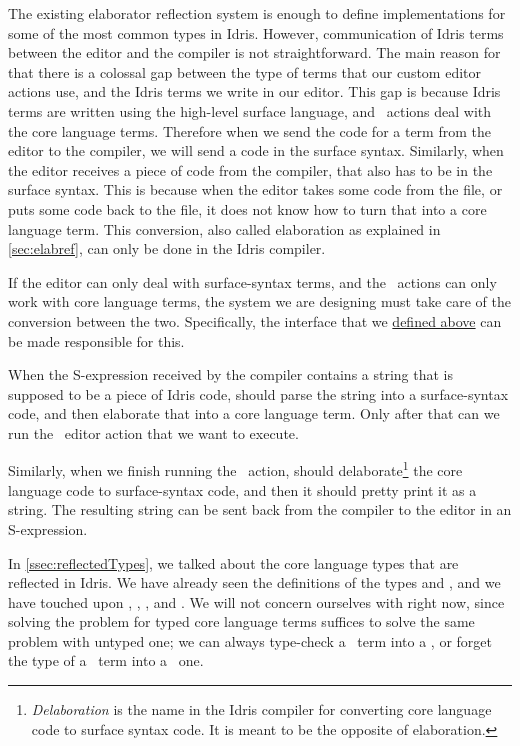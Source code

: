The existing elaborator reflection system is enough to define 
implementations for some of the most common types in Idris.
However, communication of Idris terms between the editor and the compiler is
not straightforward. The main reason for that there is a colossal gap between
the type of terms that our custom editor actions use, and the Idris terms we
write in our editor.
This gap is because Idris terms are written using the high-level surface
language, and \Elab\ actions deal with the core language terms. Therefore when
we send the code for a term from the editor to the compiler, we will send a
code in the surface syntax. Similarly, when the editor receives a piece of code
from the compiler, that also has to be in the surface syntax. This is because
when the editor takes some code from the file, or puts some code back to the
file, it does not know how to turn that into a core language term.
This conversion, also called elaboration as explained in
\autoref{sec:elabref}, can only be done in the Idris compiler.

If the editor can only deal with surface-syntax terms, and the \Elab\ actions
can only work with core language terms, the system we are designing must take
care of the conversion between the two.
Specifically, the  interface that we
\hyperref[code:editorable]{defined above} can be made responsible for this.

When the S-expression received by the compiler contains a string that is
supposed to be a piece of Idris code,  should parse the string
into a surface-syntax code, and then elaborate that into a core language term.
Only after that can we run the \Elab\ editor action that we want to execute.

Similarly, when we finish running the \Elab\ action,  should
delaborate\footnote{\emph{Delaboration} is the name in the Idris compiler for
converting core language code to surface syntax code. It is meant to be the
opposite of elaboration.} the core language code to surface-syntax code, and
then it should pretty print it as a string. The resulting string can be sent
back from the compiler to the editor in an S-expression.

In \autoref{ssec:reflectedTypes}, we talked about the core language types that
are reflected in Idris.  We have already seen the definitions of the types
 and , and we have touched upon , ,
, and .
We will not concern ourselves with  right now, since solving the
problem for typed core language terms suffices to solve the same problem with
untyped one; we can always type-check a \Raw\ term into a \TT, or forget the
type of a \TT\ term into a \Raw\ one.


